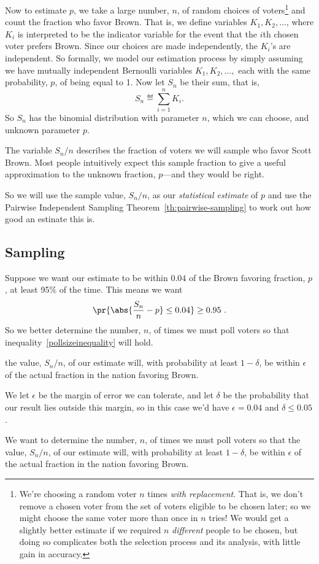 Now to estimate $p$, we take a large number, $n$, of random choices of
voters\footnote{We're choosing a random voter $n$ times \emph{with
    replacement}.  That is, we don't remove a chosen voter from the set of
  voters eligible to be chosen later; so we might choose the same voter
  more than once in $n$ tries!  We would get a slightly better estimate if
  we required $n$ \emph{different} people to be chosen, but doing so
  complicates both the selection process and its analysis, with little gain
  in accuracy.}  and count the fraction who favor Brown.  That is, we
define variables $K_1, K_2, \dots$, where $K_i$ is interpreted to be the
indicator variable for the event that the $i$th chosen voter prefers
Brown.  Since our choices are made independently, the $K_i$'s are
independent.  So formally, we model our estimation process by simply
assuming we have mutually independent Bernoulli variables $K_1, K_2,
\dots,$ each with the same probability, $p$, of being equal to 1.  Now let
$S_n$ be their sum, that is,
\begin{equation}\label{LN12:Sn}
S_n \eqdef \sum_{i=1}^n K_i.
\end{equation}
So $S_n$ has the binomial distribution with parameter $n$, which we can
choose, and unknown parameter $p$.

The variable $S_n/n$ describes the fraction of voters we will sample
who favor Scott Brown.  Most people intuitively expect this sample
fraction to give a useful approximation to the unknown fraction,
$p$---and they would be right.  
\iffalse Note that
\[
\expect{\frac{S_n}{n}} = \sum_{i=1}^n \expect{K_i} = pn.
\]
\fi
So we will use the sample value, $S_n/n$, as our \emph{statistical
  estimate} of $p$ and use the Pairwise Independent Sampling
Theorem~\ref{th:pairwise-sampling} to work out how good an estinate
this is.

\subsection{Sampling}
Suppose we want our estimate to be within $0.04$ of the Brown favoring
fraction, $p$, at least 95\% of the time.  This means we want
\begin{equation}\label{pollsizeinequality}
\pr{\abs{\frac{S_n}{n} - p} \leq 0.04} \geq 0.95\ .
\end{equation}
So we better determine the number, $n$, of times we must poll voters so
that inequality~\eqref{pollsizeinequality} will hold.

\begin{editingnotes}
the value, $S_n/n$, of our estimate will, with probability at least
$1 -\delta$, be within $\epsilon$ of the actual fraction in the nation
favoring Brown.

We let $\epsilon$ be the margin of error we can tolerate, and let $\delta$
be the probability that our result lies outside this margin, so in this
case we'd have $\epsilon = 0.04$ and $\delta \le 0.05$.

We want to determine the number, $n$, of times we must poll voters so that
the value, $S_n/n$, of our estimate will, with probability at least
$1 -\delta$, be within $\epsilon$ of the actual fraction in the nation
favoring Brown.
\end{editingnotes}

